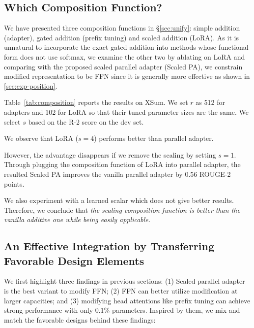 \subsection{Which Composition Function?}
\label{sec:exp-comp}

We have presented three composition functions in \S\ref{sec:unify}: simple addition (adapter), gated addition (prefix tuning) and scaled addition (LoRA). As it is unnatural to incorporate the exact gated addition into methods whose functional form does not use softmax, we examine the other two by ablating on LoRA and comparing with the proposed scaled parallel adapter (Scaled PA), we constrain modified representation to be FFN since it is generally more effective as shown in \textsection\ref{sec:exp-position}.

Table~\ref{tab:composition} reports the results on XSum. We set $r$ as 512 for adapters and 102 for LoRA so that their tuned parameter sizes are the same. We select $s$ based on the R-2 score on the dev set.

We observe that LoRA ($s=4$) performs better than parallel adapter.

However, the advantage disappears if we remove the scaling by setting $s=1$. Through plugging the composition function of LoRA into parallel adapter, the resulted Scaled PA improves the vanilla parallel adapter by 0.56 ROUGE-2 points.

We also experiment with a learned scalar which does not give better results. Therefore, we conclude that \emph{the scaling composition function is better than the vanilla additive one while being easily applicable.}

\subsection{An Effective Integration by Transferring Favorable Design Elements}
\label{sec:combine}

We first highlight three findings in previous sections: (1) Scaled parallel adapter is the best variant to modify FFN; (2) FFN can better utilize modification at larger capacities; and (3) modifying head attentions like prefix tuning can achieve strong performance with only 0.1\% parameters. Inspired by them, we mix and match the favorable designs behind these findings:

